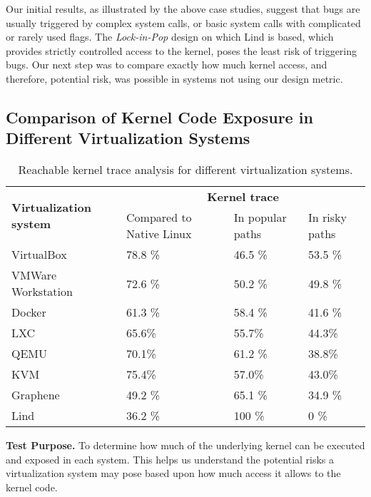 {{Our initial results, as illustrated by the above case studies, suggest
that bugs are usually triggered by complex system calls, or basic system calls
with complicated or rarely used flags. The \emph{Lock-in-Pop} design on which Lind is based,
which provides strictly controlled access to the kernel, poses
the least risk of triggering bugs. Our next step was to compare exactly how
much kernel access, and therefore, potential risk, was possible in systems not
using our design metric.


\subsection{Comparison of Kernel Code Exposure in Different Virtualization
Systems}
\label{Reachable-Kernel-Trace-Analysis-for-Different-Virtualization-Systems}

\begin{table}
\centering
\scriptsize
\caption{\small Reachable kernel trace analysis for different virtualization
systems.}
\begin{tabular}{|l|l|l|l|}
  \hline
  \multirow{3}{1.5cm}{\bf Virtualization system} & \multicolumn{3}{c|}{\bf Kernel trace} \\ \cline{2-4}
  & \multirow{2}{1.5cm}{Compared to Native Linux} & \multirow{2}{1.5cm}{In popular paths} & \multirow{2}{1cm}{In risky paths} \\
  & & & \\  \hline
  VirtualBox & 78.8 \% & 46.5 \% & 53.5 \% \\
  \hline
  \multirow{2}{1.5cm}{VMWare Workstation} & \multirow{2}{*}{72.6 \%} &
  \multirow{2}{*}{50.2 \%} & \multirow{2}{*}{49.8 \%} \\
  & & & \\   \hline
  Docker & 61.3 \% & 58.4 \% & 41.6 \% \\
  \hline
  LXC &  65.6\% &  55.7\% &  44.3\% \\
  \hline
   QEMU &  70.1\% & 61.2 \% &  38.8\% \\
  \hline
   KVM &  75.4\% &  57.0\% &  43.0\% \\
  \hline
  Graphene & 49.2 \% & 65.1 \% & 34.9 \% \\
  \hline
  Lind & 36.2 \% & 100 \% & 0 \% \\
  \hline
\end{tabular}
\label{table:trace-systems}
\end{table}

\textbf{Test Purpose.}
To determine how much of the underlying kernel can be executed and exposed in
each system. This helps us understand the potential risks a virtualization system
may pose based upon how much access it allows to the kernel code.

}}
